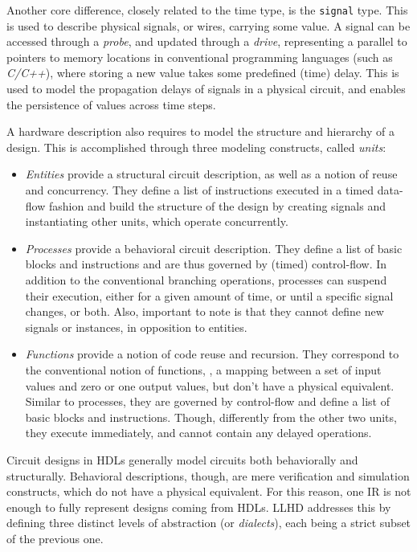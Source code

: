 Another core difference, closely related to the time type, is the \texttt{signal} type. This is used to describe physical signals, or wires, carrying some value. A signal can be accessed through a \textit{probe}, and updated through a \textit{drive}, representing a parallel to pointers to memory locations in conventional programming languages (such as \textit{C/C++}), where storing a new value takes some predefined (time) delay. This is used to model the propagation delays of signals in a physical circuit, and enables the persistence of values across time steps.

A hardware description also requires to model the structure and hierarchy of a design. This is accomplished through three modeling constructs, called \textit{units}:
\begin{itemize}
    \item \textit{Entities} provide a structural circuit description, as well as a notion of reuse and concurrency. They define a list of instructions executed in a timed data-flow fashion and build the structure of the design by creating signals and instantiating other units, which operate concurrently.
    \item \textit{Processes} provide a behavioral circuit description. They define a list of basic blocks and instructions and are thus governed by (timed) control-flow. In addition to the conventional branching operations, processes can suspend their execution, either for a given amount of time, or until a specific signal changes, or both. Also, important to note is that they cannot define new signals or instances, in opposition to entities.
    \item \textit{Functions} provide a notion of code reuse and recursion. They correspond to the conventional notion of functions, \ie, a mapping between a set of input values and zero or one output values, but don’t have a physical equivalent. Similar to processes, they are governed by control-flow and define a list of basic blocks and instructions. Though, differently from the other two units, they execute immediately, and cannot contain any delayed operations.
\end{itemize}


Circuit designs in HDLs generally model circuits both behaviorally and structurally. Behavioral descriptions, though, are mere verification and simulation constructs, which do not have a physical equivalent. For this reason, one IR is not enough to fully represent designs coming from HDLs. LLHD addresses this by defining three distinct levels of abstraction (or \textit{dialects}), each being a strict subset of the previous one.

